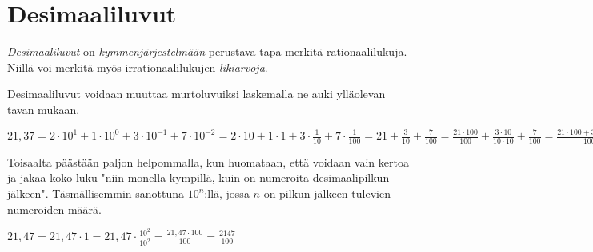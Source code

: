 \chapter{Desimaaliluvut}

\emph{Desimaaliluvut} on \emph{kymmenjärjestelmään} perustava tapa merkitä rationaalilukuja. Niillä voi merkitä myös irrationaalilukujen \emph{likiarvoja}.


Desimaaliluvut voidaan muuttaa murtoluvuiksi laskemalla ne auki ylläolevan tavan mukaan.

\begin{esimerkki}
$21,37 = 2 \cdot 10^1 + 1 \cdot 10^0 + 3 \cdot 10^{-1} + 7 \cdot 10^{-2} = 2 \cdot 10 + 1 \cdot 1 + 3 \cdot \frac{1}{10} + 7 \cdot \frac{1}{100} = 21 + \frac{3}{10} + \frac{7}{100} = \frac{21 \cdot 100}{100} + \frac{3 \cdot 10}{10 \cdot 10} + \frac{7}{100} = \frac{21 \cdot 100 + 3 \cdot 10 + 7}{100} = \frac{2100+30+7}{100} = \frac{2137}{100}$
\end{esimerkki}

Toisaalta päästään paljon helpommalla, kun huomataan, että voidaan vain kertoa ja jakaa koko luku "niin monella kympillä, kuin on numeroita desimaalipilkun jälkeen". Täsmällisemmin sanottuna $10^n$:llä, jossa $n$ on pilkun jälkeen tulevien numeroiden määrä.

\begin{esimerkki}
$21,47 = 21,47 \cdot 1 = 21,47 \cdot \frac{10^2}{10^2} = \frac{21,47 \cdot 100}{100} = \frac{2147}{100}$
\end{esimerkki}

